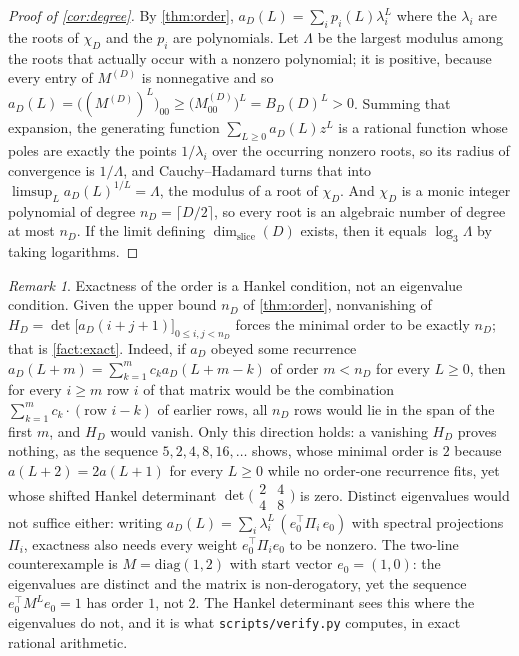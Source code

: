 \documentclass[11pt]{amsart}
\theoremstyle{definition}
\theoremstyle{remark}
\newtheorem{remark}[theorem]{Remark}
\begin{document}
\begin{proof}[Proof of \cref{cor:degree}]
By \cref{thm:order}, $a_D(L) = \sum_i p_i(L) \lambda_i^L$ where the $\lambda_i$ are the roots of $\chi_D$ and the $p_i$ are polynomials. Let $\Lambda$ be the largest modulus among the roots that actually occur with a nonzero polynomial; it is positive, because every entry of $M^{(D)}$ is nonnegative and so $a_D(L) = \bigl((M^{(D)})^L\bigr)_{00} \ge \bigl(M^{(D)}_{00}\bigr)^L = B_D(D)^L > 0$. Summing that expansion, the generating function $\sum_{L \ge 0} a_D(L) z^L$ is a rational function whose poles are exactly the points $1/\lambda_i$ over the occurring nonzero roots, so its radius of convergence is $1/\Lambda$, and Cauchy--Hadamard turns that into $\limsup_L a_D(L)^{1/L} = \Lambda$, the modulus of a root of $\chi_D$. And $\chi_D$ is a monic integer polynomial of degree $n_D = \lceil D/2 \rceil$, so every root is an algebraic number of degree at most $n_D$. If the limit defining $\dim_{\mathrm{slice}}(D)$ exists, then it equals $\log_3 \Lambda$ by taking logarithms.
\end{proof}

\begin{remark}
\label{rem:hankel}
Exactness of the order is a Hankel condition, not an eigenvalue condition. Given the upper bound $n_D$ of \cref{thm:order}, nonvanishing of $H_D = \det\bigl[a_D(i+j+1)\bigr]_{0 \le i,j < n_D}$ forces the minimal order to be exactly $n_D$; that is \cref{fact:exact}. Indeed, if $a_D$ obeyed some recurrence $a_D(L+m) = \sum_{k=1}^{m} c_k a_D(L+m-k)$ of order $m < n_D$ for every $L \ge 0$, then for every $i \ge m$ row $i$ of that matrix would be the combination $\sum_{k=1}^{m} c_k \cdot (\text{row } i-k)$ of earlier rows, all $n_D$ rows would lie in the span of the first $m$, and $H_D$ would vanish. Only this direction holds: a vanishing $H_D$ proves nothing, as the sequence $5, 2, 4, 8, 16, \dots$ shows, whose minimal order is $2$ because $a(L+2) = 2a(L+1)$ for every $L \ge 0$ while no order-one recurrence fits, yet whose shifted Hankel determinant $\det\bigl(\begin{smallmatrix} 2 & 4 \\ 4 & 8 \end{smallmatrix}\bigr)$ is zero. Distinct eigenvalues would not suffice either: writing $a_D(L) = \sum_i \lambda_i^L\, (e_0^{\top} \Pi_i\, e_0)$ with spectral projections $\Pi_i$, exactness also needs every weight $e_0^{\top}\Pi_i e_0$ to be nonzero. The two-line counterexample is $M = \mathrm{diag}(1,2)$ with start vector $e_0 = (1,0)$: the eigenvalues are distinct and the matrix is non-derogatory, yet the sequence $e_0^{\top}M^L e_0 = 1$ has order $1$, not $2$. The Hankel determinant sees this where the eigenvalues do not, and it is what \texttt{scripts/verify.py} computes, in exact rational arithmetic.
\end{remark}
\end{document}
